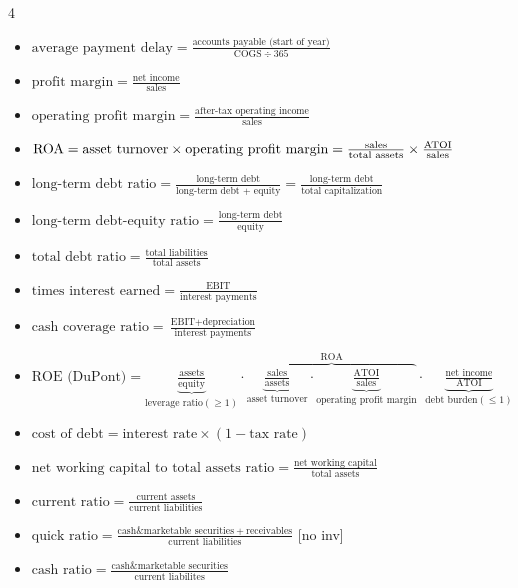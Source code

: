 \documentclass[10pt, landscape]{article}
\begin{document}
\begin{multicols*}{4}
\begin{itemize}
      \item $\text{average payment delay} = \frac{\text{accounts payable (start of year)}}{\text{COGS} \div 365}$
      \item $\text{profit margin} = \frac{\text{net income}}{\text{sales}}$
      \item $\text{operating profit margin} = \frac{\text{after-tax operating income}}{\text{sales}}$
      \item $\text{ROA} = \text{asset turnover} \times \text{operating profit margin} \newline = \frac{\text{sales}}{\text{total assets}} \times \frac{\text{ATOI}}{\text{sales}}$
      \item $\text{long-term debt ratio} = \frac{\text{long-term debt}}{\text{long-term debt + equity}} = \frac{\text{long-term debt}}{\text{total capitalization}}$
      \item $\text{long-term debt-equity ratio} = \frac{\text{long-term debt}}{\text{equity}}$
      \item $\text{total debt ratio} = \frac{\text{total liabilities}}{\text{total assets}}$
      \item $\text{times interest earned} = \frac{\text{EBIT}}{\text{interest payments}}$
      \item $\text{cash coverage ratio} = \frac{\text{EBIT} + \text{depreciation}}{\text{interest payments}}$
      \item $\text{ROE (DuPont)} = \underbrace{\frac{\text{assets}}{\text{equity}}}_{\text{leverage ratio}(\geq 1)} \cdot \overbrace{\underbrace{\frac{\text{sales}}{\text{assets}}}_{\text{asset turnover}} \cdot \underbrace{\frac{\text{ATOI}}{\text{sales}}}_{\text{operating profit margin}}}^{\text{ROA}} \cdot \underbrace{\frac{\text{net income}}{\text{ATOI}}}_{\text{debt burden}(\leq 1)}$
      \item $\text{cost of debt} = \text{interest rate} \times (1 - \text{tax rate})$
      \item $\text{net working capital to total assets ratio} = \frac{\text{net working capital}}{\text{total assets}}$
      \item $\text{current ratio} = \frac{\text{current assets}}{\text{current liabilities}}$
      \item $\text{quick ratio} = \frac{\text{cash}\&\text{marketable securities}+\text{receivables}}{\text{current liabilities}}$ [no inv]
      \item $\text{cash ratio} = \frac{\text{cash}\&\text{marketable securities}}{\text{current liabilites}}$
    \end{itemize}
    
\end{multicols*}
\end{document}
